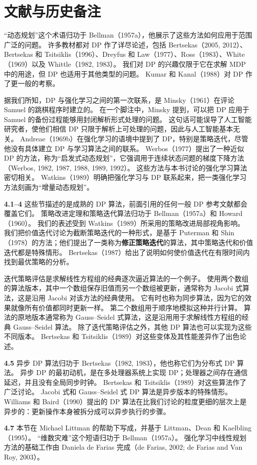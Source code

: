 \documentclass[UTF8, 12pt, fontset=fandol, oneside]{ctexart}
\begin{document}
\section*{文献与历史备注}

“动态规划”这个术语归功于 Bellman（1957a），他展示了这些方法如何应用于范围广泛的问题。
许多教材都对 DP 作了详尽论述，包括 Bertsekas（2005, 2012）、Bertsekas 和 Tsitsiklis（1996）、Dreyfus 和 Law（1977）、Ross（1983）、White（1969）以及 Whittle（1982, 1983）。
我们对 DP 的兴趣仅限于它在求解 MDP 中的用途，但 DP 也适用于其他类型的问题。
Kumar 和 Kanal（1988）对 DP 作了更一般的考察。

据我们所知，DP 与强化学习之间的第一次联系，是 Minsky（1961）在评论 Samuel 的跳棋程序时建立的。
在一个脚注中，Minsky 提到，可以把 DP 应用于 Samuel 的备份过程能够用封闭解析形式处理的问题。
这句话可能误导了人工智能研究者，使他们相信 DP 只限于解析上可处理的问题，因此与人工智能基本无关。
Andreae（1969b）在强化学习的语境中提到了 DP，特别是策略迭代，尽管他没有具体建立 DP 与学习算法之间的联系。
Werbos（1977）提出了一种近似 DP 的方法，称为“启发式动态规划”，它强调用于连续状态问题的梯度下降方法（Werbos, 1982, 1987, 1988, 1989, 1992）。
这些方法与本书讨论的强化学习算法密切相关。
Watkins（1989）明确把强化学习与 DP 联系起来，把一类强化学习方法刻画为“增量动态规划”。

\noindent\textbf{4.1--4}
这些节描述的是成熟的 DP 算法，前面引用的任何一般 DP 参考文献都会覆盖它们。
策略改进定理和策略迭代算法归功于 Bellman（1957a）和 Howard（1960）。
我们的表述受到 Watkins（1989）所采用的策略改进局部视角影响。
我们把价值迭代讨论为截断策略迭代的一种形式，是基于 Puterman 和 Shin（1978）的方法；他们提出了一类称为\textbf{修正策略迭代}的算法，其中策略迭代和价值迭代都是特殊情形。
Bertsekas（1987）给出了说明如何使价值迭代在有限时间内找到最优策略的分析。

迭代策略评估是求解线性方程组的经典逐次逼近算法的一个例子。
使用两个数组的算法版本，其中一个数组保存旧值而另一个数组被更新，通常称为 Jacobi 式算法，这是沿用 Jacobi 对该方法的经典使用。
它有时也称为同步算法，因为它的效果就像所有价值都同时更新一样。
第二个数组用于顺序地模拟这种并行计算。
算法的原地版本通常称为 Gauss--Seidel 式算法，这是沿用用于求解线性方程组的经典 Gauss--Seidel 算法。
除了迭代策略评估之外，其他 DP 算法也可以实现为这些不同版本。
Bertsekas 和 Tsitsiklis（1989）对这些变体及其性能差异作了出色论述。

\noindent\textbf{4.5}
异步 DP 算法归功于 Bertsekas（1982, 1983），他也称它们为分布式 DP 算法。
异步 DP 的最初动机，是在多处理器系统上实现 DP；处理器之间存在通信延迟，并且没有全局同步时钟。
Bertsekas 和 Tsitsiklis（1989）对这些算法作了广泛讨论。
Jacobi 式和 Gauss--Seidel 式 DP 算法是异步版本的特殊情形。
Williams 和 Baird（1990）提出的 DP 算法在比我们讨论的粒度更细的层次上是异步的：更新操作本身被拆分成可以异步执行的步骤。

\noindent\textbf{4.7}
本节在 Michael Littman 的帮助下写成，并基于 Littman、Dean 和 Kaelbling（1995）。
“维数灾难”这个短语归功于 Bellman（1957a）。
强化学习中线性规划方法的基础工作由 Daniela de Farias 完成（de Farias, 2002; de Farias and Van Roy, 2003）。
\end{document}
